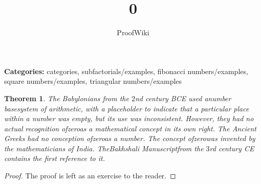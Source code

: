 \documentclass{article}
\title{0}
\author{ProofWiki}
\date{}
\newtheorem{theorem}{Theorem}
\begin{document}
\maketitle

\noindent\textbf{Categories:} categories, subfactorials/examples, fibonacci numbers/examples, square numbers/examples, triangular numbers/examples

\begin{theorem}
The Babylonians from the $2$nd century BCE used anumber basesystem of arithmetic, with a placeholder to indicate that a particular place within a number was empty, but its use was inconsistent.  However, they had no actual recognition ofzeroas a mathematical concept in its own right. The Ancient Greeks had no conception ofzeroas a number. The concept ofzerowas invented by the mathematicians of India. TheBakhshali Manuscriptfrom the $3$rd century CE contains the first reference to it.
\end{theorem}

\begin{proof}
The proof is left as an exercise to the reader.
\end{proof}
\end{document}
